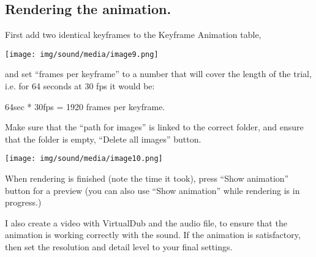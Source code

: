 \subsection{Rendering the animation.}\label{rendering-the-animation.}

First add two identical keyframes to the Keyframe Animation table,

\texttt{[image: img/sound/media/image9.png]}

and set ``frames per keyframe'' to a number that will cover the length
of the trial, i.e. for 64 seconds at 30 fps it would be:

64sec * 30fps = 1920 frames per keyframe.

Make sure that the ``path for images'' is linked to the correct folder,
and ensure that the folder is empty, ``Delete all images'' button.

\texttt{[image: img/sound/media/image10.png]}

When rendering is finished (note the time it took), press ``Show
animation'' button for a preview (you can also use ``Show animation''
while rendering is in progress.)

I also create a video with VirtualDub and the audio file, to ensure that
the animation is working correctly with the sound. If the animation is
satisfactory, then set the resolution and detail level to your final
settings.
